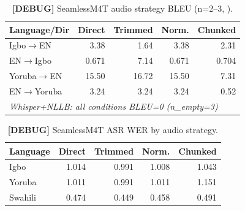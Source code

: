 
\begin{table}[t]
\centering
\small
\caption{\textbf{[DEBUG]} SeamlessM4T audio strategy BLEU (n=2--3, \dataAC{}).}
\label{tab:p3_debug_bleu}
\begin{tabular}{lrrrr}
\toprule
\textbf{Language/Dir} & \textbf{Direct} & \textbf{Trimmed} & \textbf{Norm.} & \textbf{Chunked} \\
\midrule
Igbo$\to$EN   & 3.38  &  1.64 & 3.38 &  2.31 \\
EN$\to$Igbo   & 0.671 &  7.14 & 0.671 & 0.704 \\
Yoruba$\to$EN & 15.50 & 16.72 & 15.50 & 7.31  \\
EN$\to$Yoruba & 3.24  &  3.24 & 3.24  & 0.52  \\
\midrule
\multicolumn{5}{l}{\textit{Whisper+NLLB: all conditions BLEU=0 (n\_empty=3)}} \\
\bottomrule
\end{tabular}
\end{table}

\begin{table}[t]
\centering
\small
\caption{\textbf{[DEBUG]} SeamlessM4T ASR WER by audio strategy.}
\label{tab:p3_debug_wer}
\begin{tabular}{lrrrr}
\toprule
\textbf{Language} & \textbf{Direct} & \textbf{Trimmed} & \textbf{Norm.} & \textbf{Chunked} \\
\midrule
Igbo    & 1.014 & 0.991 & 1.008 & 1.043 \\
Yoruba  & 1.011 & 0.991 & 1.011 & 1.151 \\
Swahili & 0.474 & 0.449 & 0.458 & 0.491 \\
\bottomrule
\end{tabular}
\end{table}
